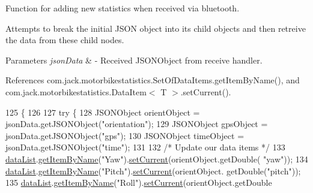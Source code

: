Function for adding new statistics when received via bluetooth. 

Attempts to break the initial J\+S\+ON object into it\textquotesingle{}s child objects and then retreive the data from these child nodes.


\begin{DoxyParams}{Parameters}
{\em json\+Data} & -\/ Received J\+S\+O\+N\+Object from receive handler. \\
\hline
\end{DoxyParams}


References com.\+jack.\+motorbikestatistics.\+Set\+Of\+Data\+Items.\+get\+Item\+By\+Name(), and com.\+jack.\+motorbikestatistics.\+Data\+Item$<$ T $>$.\+set\+Current().


\begin{DoxyCode}
125                                                     \{
126 
127         \textcolor{keywordflow}{try} \{
128             JSONObject orientObject = jsonData.getJSONObject(\textcolor{stringliteral}{"orientation"});
129             JSONObject gpsObject = jsonData.getJSONObject(\textcolor{stringliteral}{"gps"});
130             JSONObject timeObject = jsonData.getJSONObject(\textcolor{stringliteral}{"time"});
131 
132             \textcolor{comment}{/* Update our data items */}
133             \hyperlink{classcom_1_1jack_1_1motorbikestatistics_1_1_realtime_fragment_adde56e8b4f0e954a9a1167e50fb80420}{dataList}.\hyperlink{classcom_1_1jack_1_1motorbikestatistics_1_1_set_of_data_items_a028fb1f4ce3fd7991d73d368720c19d9}{getItemByName}(\textcolor{stringliteral}{"Yaw"}).\hyperlink{classcom_1_1jack_1_1motorbikestatistics_1_1_data_item_abdeab9f088a2a78f66ac852993b555ca}{setCurrent}(orientObject.getDouble(\textcolor{stringliteral}{
      "yaw"}));
134             \hyperlink{classcom_1_1jack_1_1motorbikestatistics_1_1_realtime_fragment_adde56e8b4f0e954a9a1167e50fb80420}{dataList}.\hyperlink{classcom_1_1jack_1_1motorbikestatistics_1_1_set_of_data_items_a028fb1f4ce3fd7991d73d368720c19d9}{getItemByName}(\textcolor{stringliteral}{"Pitch"}).\hyperlink{classcom_1_1jack_1_1motorbikestatistics_1_1_data_item_abdeab9f088a2a78f66ac852993b555ca}{setCurrent}(orientObject.
      getDouble(\textcolor{stringliteral}{"pitch"}));
135             \hyperlink{classcom_1_1jack_1_1motorbikestatistics_1_1_realtime_fragment_adde56e8b4f0e954a9a1167e50fb80420}{dataList}.\hyperlink{classcom_1_1jack_1_1motorbikestatistics_1_1_set_of_data_items_a028fb1f4ce3fd7991d73d368720c19d9}{getItemByName}(\textcolor{stringliteral}{"Roll"}).\hyperlink{classcom_1_1jack_1_1motorbikestatistics_1_1_data_item_abdeab9f088a2a78f66ac852993b555ca}{setCurrent}(orientObject.getDouble

\end{DoxyCode}
